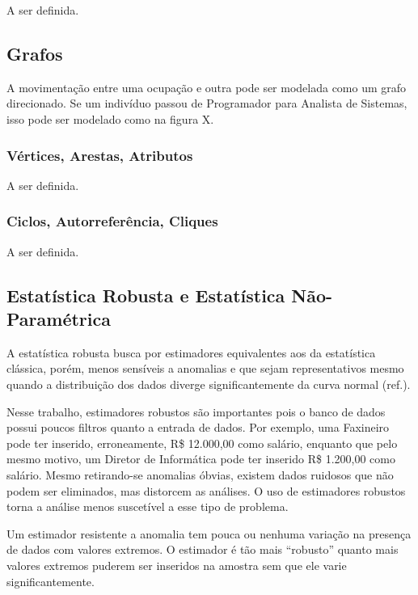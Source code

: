 \documentclass[12pt,a4paper]{article}
\begin{document}
A ser definida.

\subsection{Grafos}

A movimentação entre uma ocupação e outra pode ser modelada como um grafo direcionado. Se um indivíduo passou de Programador para Analista de Sistemas, isso pode ser modelado como na figura X.


\subsubsection*{Vértices, Arestas, Atributos}

A ser definida.

\subsubsection*{Ciclos, Autorreferência, Cliques}

A ser definida.

\subsection{Estatística Robusta e Estatística Não-Paramétrica}

A estatística robusta busca por estimadores equivalentes aos da estatística clássica, porém, menos sensíveis a anomalias e que sejam representativos mesmo quando a distribuição dos dados diverge significantemente da curva normal (ref.).

Nesse trabalho, estimadores robustos são importantes pois o banco de dados possui poucos filtros quanto a entrada de dados. Por exemplo, uma Faxineiro pode ter inserido, erroneamente, R\$ 12.000,00 como salário, enquanto que pelo mesmo motivo, um Diretor de Informática pode ter inserido R\$ 1.200,00 como salário. Mesmo retirando-se anomalias óbvias, existem dados ruidosos que não podem ser eliminados, mas distorcem as análises. O uso de estimadores robustos torna a análise menos suscetível a esse tipo de problema.

Um estimador resistente a anomalia tem pouca ou nenhuma variação na presença de dados com valores extremos. O estimador é tão mais \enquote{robusto} quanto mais valores extremos puderem ser inseridos na amostra sem que ele varie significantemente.
\end{document}
